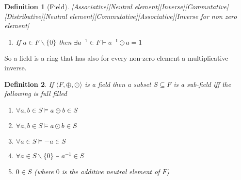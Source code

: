 \documentclass{book}
\newcommand{\um}{-}
\newtheorem{definition}{Definition}
{\theorembodyfont{\rmfamily}\newtheorem{example}{Example}}
\begin{document}
{{\begin{definition}[Field][Associative][Neutral
element][Inverse][Commutative][Distributive][Neutral
element][Commutative][Associative][Inverse for non zero element]
\begin{enumerate}
\begin{enumerate}
\begin{enumerate}
        \item $\exists 0 \in F \vdash \forall a \in F \vDash a \oplus 0 = a =
        0 \oplus a$
        
        \item $\forall a \in F$ there $\exists \um a \in F \vDash a \oplus
        (\um a) = 0 = (\um a) \oplus a$
        
        \item $\forall a, b \in F \vdash a \oplus b = b \oplus a$
      \end{enumerate}
      \item $\forall a, b, c \in F \vDash a \odot (b \oplus c) = (a \odot b)
      \oplus (a \odot c)$
      
      \item $\exists 1 \in F \vdash \forall a \in F \vDash a \odot 1 = a = 1
      \odot a$
      
      \item $\forall a, b \in F \vDash a \odot b = b \odot a$
      
      \item $\forall a, b, c \in F \vDash a \odot (b \odot c) = (a \odot b)
      \odot c$
    \end{enumerate}
    \item If $a \in F \backslash \{ 0 \}$ then $\exists a^{\um 1} \in F \vdash
    a^{\um 1} \odot a = 1$
  \end{enumerate}
\end{definition}

So a field is a ring that has also for every non-zero element a multiplicative
inverse.

\begin{definition}
  \label{sub-field}{}If $\langle F, \oplus, \odot \rangle$ is
  a field then a subset $S \subseteq F$ is a sub-field iff the following is
  full filled
  \begin{enumerate}
    \item $\forall a, b \in S \vDash a \oplus b \in S$
    
    \item $\forall a, b \in S \vDash a \odot b \in S$
    
    \item $\forall a \in S \vDash - a \in S$
    
    \item $\forall a \in S \backslash \{ 0 \} \vDash a^{- 1} \in S$
    
    \item $0 \in S$ (where $0$ is the additive neutral element of $F$)
    

\end{enumerate}
\end{definition}}}
\end{document}
